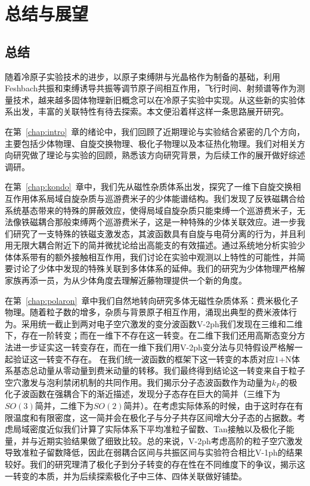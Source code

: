 \chapter{总结与展望}\label{chap:sum}

\section{总结}
随着冷原子实验技术的进步，以原子束缚阱与光晶格作为制备的基础，利用Feshbach共振和束缚诱导共振等调节原子间相互作用，飞行时间、射频谱等作为测量技术，越来越多固体物理新旧概念可以在冷原子实验中实现。从这些新的实验体系出发，丰富的关联特性有待去探索。本文便沿着样这样一条思路展开研究。

在第~\ref{chap:intro}~章的绪论中，我们回顾了近期理论与实验结合紧密的几个方向，主要包括少体物理、自旋交换物理、极化子物理以及本征热化物理。我们对相关方向研究做了理论与实验的回顾，熟悉该方向研究背景，为后续工作的展开做好综述调研。

在第~\ref{chap:kondo}~章中，我们先从磁性杂质体系出发，探究了一维下自旋交换相互作用体系局域自旋杂质与巡游费米子的少体能谱结构。我们发现了反铁磁耦合给系统基态带来的特殊的屏蔽效应，使得局域自旋杂质只能束缚一个巡游费米子，无法像铁磁耦合那般束缚两个巡游费米子，这是一种特殊的少体关联效应。进一步我们研究了一支特殊的铁磁支激发态，其波函数具有自旋与电荷分离的行为，并且利用无限大耦合附近下的简并微扰论给出高能支的有效描述。通过系统地分析实验少体体系带有的额外接触相互作用，我们讨论在实验中观测以上特性的可能性，并简要讨论了少体中发现的特殊关联到多体体系的延伸。我们的研究为少体物理严格解家族再添一员，为从少体角度去理解近藤物理提供一个新的角度。

在第~\ref{chap:polaron}~章中我们自然地转向研究多体无磁性杂质体系：费米极化子物理。随着粒子数的增多，杂质与背景原子相互作用，涌现出典型的费米液体行为。采用统一截止到两对电子空穴激发的变分波函数V-2ph我们发现在三维和二维下，存在一阶转变；而在一维下不存在这一转变。在二维下我们还用高斯态变分方法进一步证实这一转变存在，而在一维下我们用V-2ph变分法与贝特假设严格解一起验证这一转变不存在。 在我们统一波函数的框架下这一转变的本质对应1+N体系基态总动量从零动量到费米动量的转移。我们最终得到结论这一转变来自于粒子空穴激发与泡利禁闭机制的共同作用。我们揭示分子态波函数作为动量为$k_F$的极化子波函数在强耦合下的渐近描述，发现分子态存在巨大的简并（三维下为$SO(3)$简并，二维下为$SO(2)简并$）。在考虑实际体系的时候，由于这时存在有限温度和有限密度，这一简并会在极化子与分子共存区间增大分子态的占据数。考虑局域密度近似我们计算了实际体系下平均准粒子留数、Tan接触以及极化子能量，并与近期实验结果做了细致比较。总的来说，V-2ph考虑高阶的粒子空穴激发导致准粒子留数降低，因此在弱耦合区间与共振区间与实验符合相比V-1ph的结果较好。我们的研究理清了极化子到分子转变的存在性在不同维度下的争议，揭示这一转变的本质，并为后续探索极化子中三体、四体关联做好铺垫。

